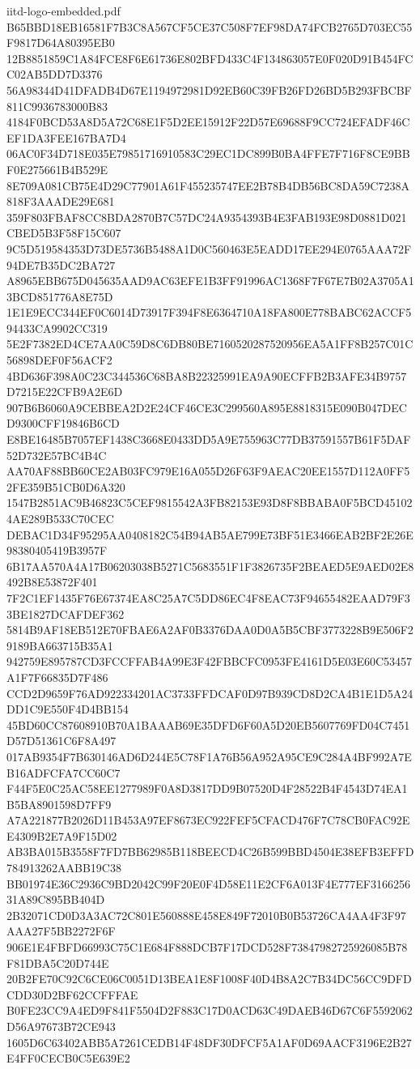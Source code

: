 \begin{filecontents*}[overwrite]{iitd-logo-embedded.pdf}
B65BBD18EB16581F7B3C8A567CF5CE37C508F7EF98DA74FCB2765D703EC55F9817D64A80395EB0
12B8851859C1A84FCE8F6E61736E802BFD433C4F134863057E0F020D91B454FCC02AB5DD7D3376
56A98344D41DFADB4D67E1194972981D92EB60C39FB26FD26BD5B293FBCBF811C9936783000B83
4184F0BCD53A8D5A72C68E1F5D2EE15912F22D57E69688F9CC724EFADF46CEF1DA3FEE167BA7D4
06AC0F34D718E035E79851716910583C29EC1DC899B0BA4FFE7F716F8CE9BBF0E275661B4B529E
8E709A081CB75E4D29C77901A61F455235747EE2B78B4DB56BC8DA59C7238A818F3AAADE29E681
359F803FBAF8CC8BDA2870B7C57DC24A9354393B4E3FAB193E98D0881D021CBED5B3F58F15C607
9C5D519584353D73DE5736B5488A1D0C560463E5EADD17EE294E0765AAA72F94DE7B35DC2BA727
A8965EBB675D045635AAD9AC63EFE1B3FF91996AC1368F7F67E7B02A3705A13BCD851776A8E75D
1E1E9ECC344EF0C6014D73917F394F8E6364710A18FA800E778BABC62ACCF594433CA9902CC319
5E2F7382ED4CE7AA0C59D8C6DB80BE7160520287520956EA5A1FF8B257C01C56898DEF0F56ACF2
4BD636F398A0C23C344536C68BA8B22325991EA9A90ECFFB2B3AFE34B9757D7215E22CFB9A2E6D
907B6B6060A9CEBBEA2D2E24CF46CE3C299560A895E8818315E090B047DECD9300CFF19846B6CD
E8BE16485B7057EF1438C3668E0433DD5A9E755963C77DB37591557B61F5DAF52D732E57BC4B4C
AA70AF88BB60CE2AB03FC979E16A055D26F63F9AEAC20EE1557D112A0FF52FE359B51CB0D6A320
1547B2851AC9B46823C5CEF9815542A3FB82153E93D8F8BBABA0F5BCD451024AE289B533C70CEC
DEBAC1D34F95295AA0408182C54B94AB5AE799E73BF51E3466EAB2BF2E26E98380405419B3957F
6B17AA570A4A17B06203038B5271C5683551F1F3826735F2BEAED5E9AED02E8492B8E53872F401
7F2C1EF1435F76E67374EA8C25A7C5DD86EC4F8EAC73F94655482EAAD79F33BE1827DCAFDEF362
5814B9AF18EB512E70FBAE6A2AF0B3376DAA0D0A5B5CBF3773228B9E506F29189BA663715B35A1
942759E895787CD3FCCFFAB4A99E3F42FBBCFC0953FE4161D5E03E60C53457A1F7F66835D7F486
CCD2D9659F76AD922334201AC3733FFDCAF0D97B939CD8D2CA4B1E1D5A24DD1C9E550F4D4BB154
45BD60CC87608910B70A1BAAAB69E35DFD6F60A5D20EB5607769FD04C7451D57D51361C6F8A497
017AB9354F7B630146AD6D244E5C78F1A76B56A952A95CE9C284A4BF992A7EB16ADFCFA7CC60C7
F44F5E0C25AC58EE1277989F0A8D3817DD9B07520D4F28522B4F4543D74EA1B5BA8901598D7FF9
A7A221877B2026D11B453A97EF8673EC922FEF5CFACD476F7C78CB0FAC92EE4309B2E7A9F15D02
AB3BA015B3558F7FD7BB62985B118BEECD4C26B599BBD4504E38EFB3EFFD784913262AABB19C38
BB01974E36C2936C9BD2042C99F20E0F4D58E11E2CF6A013F4E777EF316625631A89C895BB404D
2B32071CD0D3A3AC72C801E560888E458E849F72010B0B53726CA4AA4F3F97AAA27F5BB2272F6F
906E1E4FBFD66993C75C1E684F888DCB7F17DCD528F73847982725926085B78F81DBA5C20D744E
20B2FE70C92C6CE06C0051D13BEA1E8F1008F40D4B8A2C7B34DC56CC9DFDCDD30D2BF62CCFFFAE
B0FE23CC9A4ED9F841F5504D2F883C17D0ACD63C49DAEB46D67C6F5592062D56A97673B72CE943
1605D6C63402ABB5A7261CEDB14F48DF30DFCF5A1AF0D69AACF3196E2B27E4FF0CECB0C5E639E2

\end{filecontents*}
